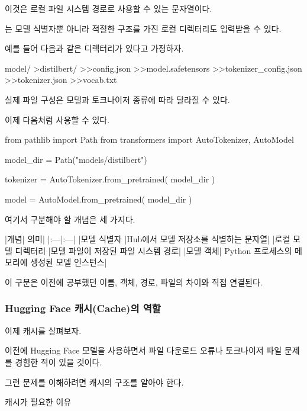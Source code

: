 이것은 로컬 파일 시스템 경로로 사용할 수 있는 문자열이다.

는 모델 식별자뿐 아니라 적절한 구조를 가진 로컬 디렉터리도 입력받을 수 있다.

예를 들어 다음과 같은 디렉터리가 있다고 가정하자.

\begin{dhkdir}[in=6]
model/
>distilbert/
>>config.json
>>model.safetensors
>>tokenizer_config.json
>>tokenizer.json
>>vocab.txt
\end{dhkdir}

실제 파일 구성은 모델과 토크나이저 종류에 따라 달라질 수 있다.

이제 다음처럼 사용할 수 있다.

\begin{dhkcode}
from pathlib import Path
from transformers import AutoTokenizer, AutoModel

model_dir = Path("models/distilbert")

tokenizer = AutoTokenizer.from_pretrained(
    model_dir
)

model = AutoModel.from_pretrained(
    model_dir
)
\end{dhkcode}

여기서 구분해야 할 개념은 세 가지다.

\begin{dhktable}
|개념|	의미|
|:---|:---|
|모델 식별자	|Hub에서 모델 저장소를 식별하는 문자열|
|로컬 모델 디렉터리	|모델 파일이 저장된 파일 시스템 경로|
|모델 객체|	Python 프로세스의 메모리에 생성된 모델 인스턴스|
\end{dhktable}

이 구분은 이전에 공부했던 이름, 객체, 경로, 파일의 차이와 직접 연결된다.

\subsubsection{Hugging Face 캐시(Cache)의 역할}

이제 캐시를 살펴보자.

이전에 Hugging Face 모델을 사용하면서 파일 다운로드 오류나 토크나이저 파일 문제를 경험한 적이 있을 것이다.

그런 문제를 이해하려면 캐시의 구조를 알아야 한다.

\begin{dhknote}
\begin{dhksmry}[centered]
캐시가 필요한 이유
\end{dhksmry}
\end{dhknote}

